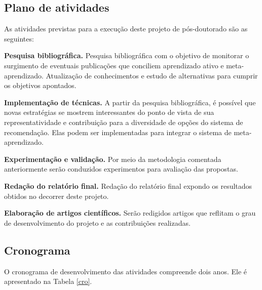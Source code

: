 \subsection{Plano de atividades}
As atividades previstas para a execução deste projeto de pós-doutorado são as seguintes:

\begin{compactenum}

\item{\textbf{Pesquisa bibliográfica.} Pesquisa bibliográfica com o objetivo de
monitorar o surgimento de eventuais publicações que conciliem aprendizado ativo e meta-aprendizado. Atualização de conhecimentos e estudo de alternativas para cumprir os objetivos apontados.}

\item{\textbf{Implementação de técnicas.} A partir da pesquisa bibliográfica, é possível que novas estratégias se mostrem interessantes do ponto de 
vista de sua representatividade e contribuição para a diversidade de opções
do sistema de recomendação. Elas podem ser implementadas para integrar o sistema de meta-aprendizado.}

\item{\textbf{Experimentação e validação.} Por meio da metodologia comentada anteriormente serão conduzidos experimentos para avaliação das propostas.}

\item {\textbf{Redação do relatório final.} Redação do relatório final expondo os resultados obtidos no decorrer deste projeto.}

\item{\textbf{Elaboração de artigos científicos.} Serão redigidos artigos que reflitam o grau de desenvolvimento do projeto e as contribuições realizadas.}
\end{compactenum}

\subsection{Cronograma}\label{ssec:Cronograma}
O cronograma de desenvolvimento das atividades compreende dois anos.
Ele é apresentado na Tabela \ref{cro}.

\newcommand{\y}{\rule{13pt}{5pt}}
\newcommand{\x}{\hspace*{4pt}}
\setlength{\tabcolsep}{0pt}

